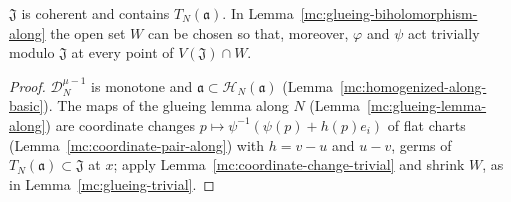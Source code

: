 \begin{lemma}
\label{mc:glueing-trivial-along}
\leanok
\(\mathfrak J\) is coherent and contains \(T_N(\mathfrak a)\). In Lemma~\ref{mc:glueing-biholomorphism-along} the open set \(W\) can be chosen so that, moreover, \(\varphi\) and
\(\psi\) act trivially modulo \(\mathfrak J\) at every point of \(V(\mathfrak J)\cap W\).
\end{lemma}
\begin{proof}
\leanok
\(\mathcal D_N^{\mu-1}\) is monotone and \(\mathfrak a\subset\mathcal H_N(\mathfrak a)\) (Lemma~\ref{mc:homogenized-along-basic}). The maps of the glueing lemma along \(N\)
(Lemma~\ref{mc:glueing-lemma-along}) are coordinate changes \(p\mapsto\psi^{-1}(\psi(p)+h(p)e_i)\) of flat charts (Lemma~\ref{mc:coordinate-pair-along}) with
\(h=v-u\) and \(u-v\), germs of \(T_N(\mathfrak a)\subset\mathfrak J\) at \(x\); apply Lemma~\ref{mc:coordinate-change-trivial} and shrink \(W\), as in
Lemma~\ref{mc:glueing-trivial}.
\end{proof}

